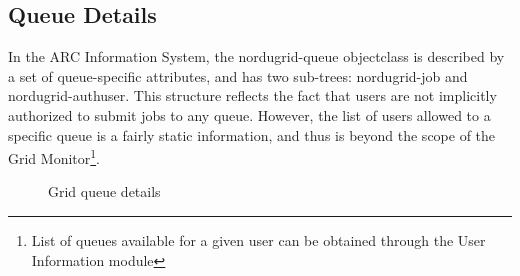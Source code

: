\documentclass{article}
\begin{document}
\begin{figure}[ht]
\end{figure}

\subsection{Queue Details}
\label{sec:quelist}

In the ARC Information System,  the
\textsf{nordugrid-queue} objectclass is described by a set of
queue-specific attributes, and has two sub-trees: \textsf{nordugrid-job}
and  \textsf{nordugrid-authuser}. This structure reflects the
fact that users are not implicitly authorized to submit jobs to any
queue. However, the list of users allowed to a specific queue is a
fairly static information, and thus is beyond the scope of the Grid
Monitor\footnote{List of queues available for a given user can be
obtained through the User Information module}.

\begin{figure}[ht]
\caption{\label{fig:quelist}Grid queue details}
\end{figure}
\end{document}
